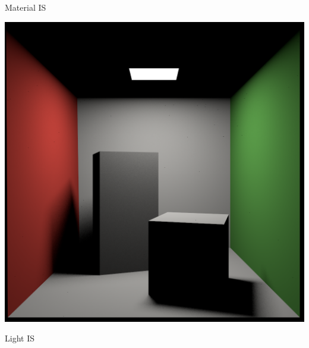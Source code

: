 \documentclass[utf8,stillsansserifmath,fleqn,t]{beamer}
\begin{document}
\begin{frame}[label=light-importance-sampling-3]
\begin{minipage}[t]{.33\textwidth}
\centerline{Material IS}
\end{minipage}\hfill
\begin{minipage}[t]{.33\textwidth}
\includegraphics[width=\textwidth]{./fig/pathtracer-result-10-1.png}
\centerline{Light IS}
\end{minipage}
\end{frame}
\end{document}
